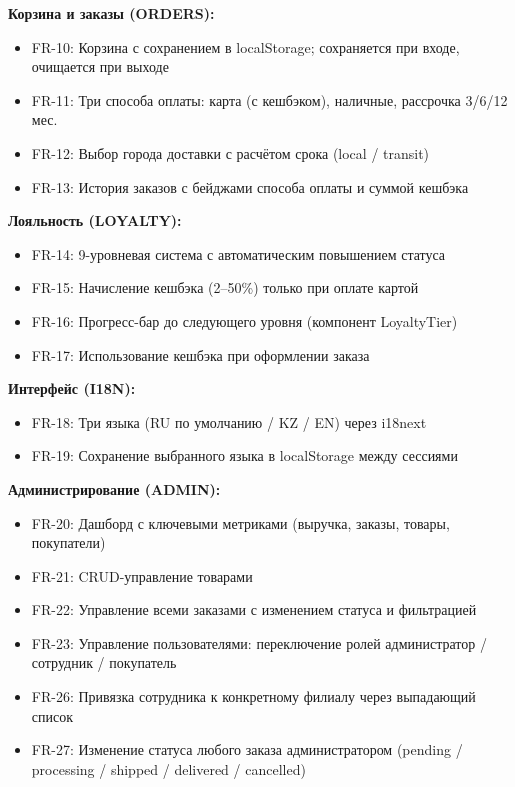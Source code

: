 \documentclass[14pt,a4paper]{extreport}
\begin{document}
\textbf{Корзина и заказы (ORDERS):}
\begin{itemize}
  \item FR-10: Корзина с сохранением в localStorage; сохраняется при входе, очищается при выходе
  \item FR-11: Три способа оплаты: карта (с кешбэком), наличные, рассрочка 3/6/12 мес.
  \item FR-12: Выбор города доставки с расчётом срока (local / transit)
  \item FR-13: История заказов с бейджами способа оплаты и суммой кешбэка
\end{itemize}

\textbf{Лояльность (LOYALTY):}
\begin{itemize}
  \item FR-14: 9-уровневая система с автоматическим повышением статуса
  \item FR-15: Начисление кешбэка (2--50\%) только при оплате картой
  \item FR-16: Прогресс-бар до следующего уровня (компонент LoyaltyTier)
  \item FR-17: Использование кешбэка при оформлении заказа
\end{itemize}

\textbf{Интерфейс (I18N):}
\begin{itemize}
  \item FR-18: Три языка (RU по умолчанию / KZ / EN) через i18next
  \item FR-19: Сохранение выбранного языка в localStorage между сессиями
\end{itemize}

\textbf{Администрирование (ADMIN):}
\begin{itemize}
  \item FR-20: Дашборд с ключевыми метриками (выручка, заказы, товары, покупатели)
  \item FR-21: CRUD-управление товарами
  \item FR-22: Управление всеми заказами с изменением статуса и фильтрацией
  \item FR-23: Управление пользователями: переключение ролей администратор / сотрудник / покупатель
  \item FR-26: Привязка сотрудника к конкретному филиалу через выпадающий список
  \item FR-27: Изменение статуса любого заказа администратором (pending / processing / shipped / delivered / cancelled)
\end{itemize}
\end{document}
